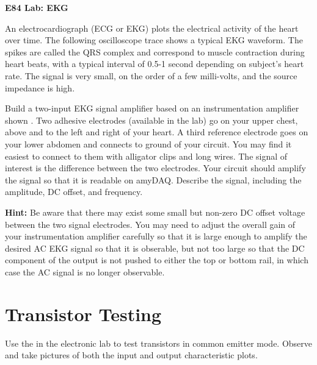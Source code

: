 \usepackage{html}


{\Large \bf E84 Lab: EKG}


An electrocardiograph (ECG or EKG) plots the electrical 
activity of the heart over time. The following oscilloscope
trace shows a typical EKG waveform. The spikes are called the
QRS complex and correspond to muscle contraction during heart
beats, with a typical interval of 0.5-1 second depending on 
subject's heart rate. The signal is very small, on the order 
of a few milli-volts, and the source impedance is high.


Build a two-input EKG signal amplifier based on an instrumentation
amplifier shown 
.
Two adhesive electrodes (available in the lab) go on your upper 
chest, above and to the left and right of your heart. A third 
reference electrode goes on your lower abdomen and connects to 
ground of your circuit. You may find it easiest to connect to
them with alligator clips and long wires. The signal of interest
is the difference between the two electrodes. Your circuit should
amplify the signal so that it is readable on amyDAQ. Describe the
signal, including the amplitude, DC offset, and frequency. 


{\bf Hint: } Be aware that there may exist some small but non-zero
DC offset voltage between the two signal electrodes. You may need
to adjust the overall gain of your instrumentation amplifier 
carefully so that it is large enough to amplify the desired AC
EKG signal so that it is obserable, but not too large so that 
the DC component of the output is not pushed to either the top 
or bottom rail, in which case the AC signal is no longer 
observable.








\section{Transistor Testing}

Use the 
in the electronic lab to test 
transistors in common emitter mode. 
Observe and take pictures of both the input and output characteristic plots. 


